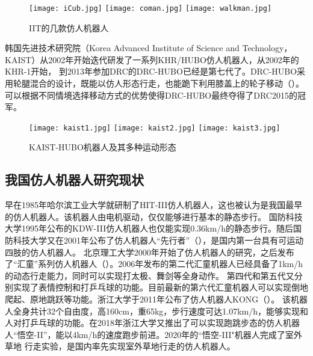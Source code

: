 \begin{figure}[htbp]
    \centering
        {%
            \texttt{[image: iCub.jpg]}}
        {%
            \texttt{[image: coman.jpg]}}
        {%
            \texttt{[image: walkman.jpg]}}            
    \caption{IIT的几款仿人机器人\label{fig:iit_biped}}
\end{figure}
韩国先进技术研究院（Korea Advanced Institute of Science and Technology，KAIST）从2002年开始迭代研发了一系列KHR/HUBO仿人机器人，从2002年的KHR-1开始，
到2013年参加DRC的DRC-HUBO已经是第七代了。DRC-HUBO采用轮腿混合的设计，既能以仿人形态行走，也能跪下利用膝盖上的轮子移动\cite{zucker2015general}（）。
可以根据不同情境选择移动方式的优势使得DRC-HUBO最终夺得了DRC2015的冠军。

\begin{figure}[htbp]
    \centering
    \texttt{[image: kaist1.jpg]}
    \texttt{[image: kaist2.jpg]}
    \texttt{[image: kaist3.jpg]}
    \caption{\label{fig:kaist_hubo}KAIST-HUBO机器人及其多种运动形态}
\end{figure}
\subsection{我国仿人机器人研究现状}
早在1985年哈尔滨工业大学就研制了HIT-III仿人机器人，这也被认为是我国最早的仿人机器人\cite{谢涛2002}。该机器人由电机驱动，仅仅能够进行基本的静态步行。
国防科技大学1995年公布的KDW-III仿人机器人也仅能实现0.36km/h的静态步行。随后国防科技大学又在2001年公布了仿人机器人“先行者”（），是国内第一台具有可运动四肢的仿人机器人。
北京理工大学2000年开始了仿人机器人的研究，之后发布了“汇童”系列仿人机器人（）。2006年发布的第二代汇童机器人已经具备了1km/h的动态行走能力，同时可以实现打太极、舞剑等全身动作。
第四代和第五代又分别实现了表情控制和打乒乓球的功能。目前最新的第六代汇童机器人可以实现倒地爬起、原地跳跃等功能\cite{huang2019historical}。浙江大学于2011年公布了仿人机器人KONG\cite{sun2011balance}（）。
该机器人全身共计32个自由度，高160cm，重65kg，步行速度可达1.07km/h，能够实现和人对打乒乓球的功能。在2018年浙江大学又推出了可以实现跑跳步态的仿人机器人“悟空-II”，能以4km/h的速度跑步前进。2020年的“悟空-III"机器人完成了室外草地
行走实验，是国内率先实现室外草地行走的仿人机器人。

